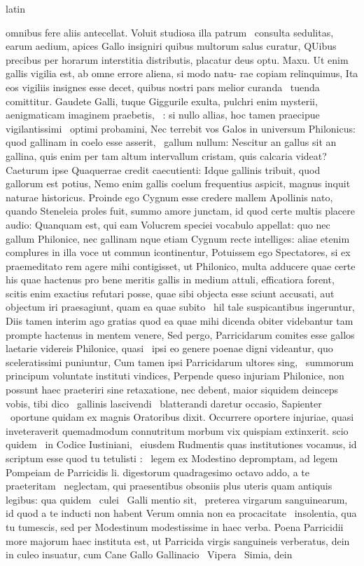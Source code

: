 \documentclass[12pt]{book}
\renewenvironment{latin}
    	{\begin{hyphenrules}{latin}}
    	{\end{hyphenrules}}
\begin{document}
\begin{pages}
\begin{latin}
\begin{Leftside}
omnibus fere aliis antecellat. Voluit studiosa illa patrum ﻿\ampersand\ consulta sedulitas, earum aedium, apices Gallo insigniri quibus multorum salus curatur, QUibus precibus per horarum interstitia distributis, placatur deus optu. Maxu. Ut enim gallis vigilia est, ab omne errore aliena, si modo natu-   rae copiam relinquimus, Ita eos vigiliis insignes esse decet, quibus nostri pars melior curanda ﻿\ampersand\ tuenda comittitur. Gaudete Galli, tuque Giggurile exulta, pulchri enim mysterii, aenigmaticam imaginem praebetis, ﻿\ampersand\ : si nullo allias, hoc tamen praecipue vigilantissimi ﻿\ampersand\ optimi probamini, Nec terrebit vos Galos in universum Philonicus: quod gallinam in coelo esse asserit, ﻿\ampersand\ gallum nullum: Nescitur an gallus sit an gallina, quis enim per tam altum intervallum cristam, quis calcaria videat? Caeturum ipse Quaquerrae credit caecutienti: Idque gallinis tribuit, quod gallorum est potius, Nemo enim gallis coelum frequentius aspicit, magnus inquit naturae historicus. Proinde ego Cygnum esse credere mallem Apollinis nato, quando Steneleia proles fuit, summo amore junctam, id quod certe multis placere audio: Quanquam est, qui eam Volucrem speciei vocabulo appellat: quo nec gallum Philonice, nec gallinam nque etiam Cygnum recte intelliges: aliae etenim complures in illa voce ut commun icontinentur, Potuissem ego Spectatores, si ex praemeditato rem agere mihi contigisset, ut Philonico, multa adducere quae certe his quae hactenus pro bene meritis gallis in medium attuli, efficatiora forent, scitis enim exactius refutari posse, quae sibi objecta esse sciunt accusati, aut objectum iri praesagiunt, quam ea quae subito ﻿\ampersand\ hil tale suspicantibus ingeruntur, Diis tamen interim ago gratias quod ea quae mihi dicenda obiter videbantur tam prompte hactenus in mentem venere, Sed pergo, Parricidarum comites esse gallos laetarie videreis Philonice, quasi ﻿\ampersand\ ipsi eo genere poenae digni videantur, quo sceleratissimi puniuntur, Cum tamen ipsi Parricidarum ultores sing, ﻿\ampersand\ summorum principum voluntate instituti vindices, Perpende queso injuriam Philonice, non possunt haec praeteriri sine retaxatione, nec debent, maior siquidem deinceps vobis, tibi dico ﻿\ampersand\ gallinis lascivendi ﻿\ampersand\ blatterandi daretur occasio, Sapienter ﻿\ampersand\ oportune   quidam ex magnis Oratoribus dixit. Occurrere oportere injuriae, quasi inveteraverit quemadmodum connutritum morbum vix quispiam extinxerit. scio quidem ﻿\ampersand\ in Codice Iustiniani, ﻿\ampersand\ eiusdem Rudmentis quas institutiones vocamus, id scriptum esse quod tu tetulisti : ﻿\ampersand\ legem ex Modestino depromptam, ad legem Pompeiam de Parricidis li. digestorum quadragesimo octavo addo, a te praeteritam ﻿\ampersand\ neglectam, qui praesentibus obsoniis plus uteris quam antiquis legibus: qua quidem ﻿\ampersand\ culei ﻿\ampersand\ Galli mentio sit, ﻿\ampersand\ preterea  virgarum sanguinearum, id quod a te inducti non habent Verum omnia non ea procacitate ﻿\ampersand\ insolentia, qua tu tumescis, sed per Modestinum modestissime in haec verba. Poena Parricidii more majorum haec instituta est, ut Parricida virgis sanguineis verberatus, dein in culeo insuatur, cum Cane Gallo Gallinacio ﻿\ampersand\ Vipera ﻿\ampersand\ Simia, dein 
\end{Leftside}
\end{latin}
\end{pages}
\end{document}
